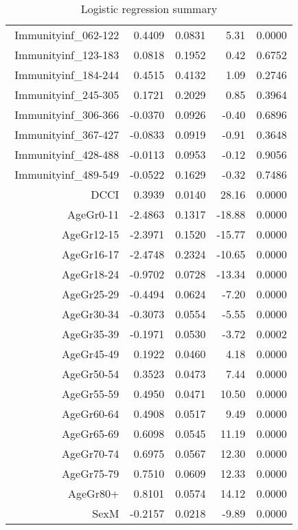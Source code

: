 \begin{table}[ht]
\begin{tabular}{rrrrr}
$$  Immunityinf\_062-122 & 0.4409 & 0.0831 & 5.31 & 0.0000 \\ 
  Immunityinf\_123-183 & 0.0818 & 0.1952 & 0.42 & 0.6752 \\ 
  Immunityinf\_184-244 & 0.4515 & 0.4132 & 1.09 & 0.2746 \\ 
  Immunityinf\_245-305 & 0.1721 & 0.2029 & 0.85 & 0.3964 \\ 
  Immunityinf\_306-366 & -0.0370 & 0.0926 & -0.40 & 0.6896 \\ 
  Immunityinf\_367-427 & -0.0833 & 0.0919 & -0.91 & 0.3648 \\ 
  Immunityinf\_428-488 & -0.0113 & 0.0953 & -0.12 & 0.9056 \\ 
  Immunityinf\_489-549 & -0.0522 & 0.1629 & -0.32 & 0.7486 \\ 
  DCCI & 0.3939 & 0.0140 & 28.16 & 0.0000 \\ 
  AgeGr0-11 & -2.4863 & 0.1317 & -18.88 & 0.0000 \\ 
  AgeGr12-15 & -2.3971 & 0.1520 & -15.77 & 0.0000 \\ 
  AgeGr16-17 & -2.4748 & 0.2324 & -10.65 & 0.0000 \\ 
  AgeGr18-24 & -0.9702 & 0.0728 & -13.34 & 0.0000 \\ 
  AgeGr25-29 & -0.4494 & 0.0624 & -7.20 & 0.0000 \\ 
  AgeGr30-34 & -0.3073 & 0.0554 & -5.55 & 0.0000 \\ 
  AgeGr35-39 & -0.1971 & 0.0530 & -3.72 & 0.0002 \\ 
  AgeGr45-49 & 0.1922 & 0.0460 & 4.18 & 0.0000 \\ 
  AgeGr50-54 & 0.3523 & 0.0473 & 7.44 & 0.0000 \\ 
  AgeGr55-59 & 0.4950 & 0.0471 & 10.50 & 0.0000 \\ 
  AgeGr60-64 & 0.4908 & 0.0517 & 9.49 & 0.0000 \\ 
  AgeGr65-69 & 0.6098 & 0.0545 & 11.19 & 0.0000 \\ 
  AgeGr70-74 & 0.6975 & 0.0567 & 12.30 & 0.0000 \\ 
  AgeGr75-79 & 0.7510 & 0.0609 & 12.33 & 0.0000 \\ 
  AgeGr80+ & 0.8101 & 0.0574 & 14.12 & 0.0000 \\ 
  SexM & -0.2157 & 0.0218 & -9.89 & 0.0000 \\ 
   \hline
\end{tabular}
\caption{Logistic regression summary} 
\end{table}
